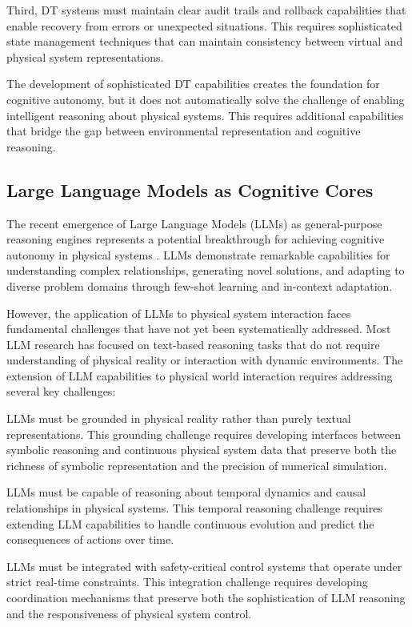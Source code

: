 Third, DT systems must maintain clear audit trails and rollback capabilities that enable recovery from errors or unexpected situations. This requires sophisticated state management techniques that can maintain consistency between virtual and physical system representations.

The development of sophisticated DT capabilities creates the foundation for cognitive autonomy, but it does not automatically solve the challenge of enabling intelligent reasoning about physical systems. This requires additional capabilities that bridge the gap between environmental representation and cognitive reasoning.

\subsection{Large Language Models as Cognitive Cores}

The recent emergence of Large Language Models (LLMs) as general-purpose reasoning engines represents a potential breakthrough for achieving cognitive autonomy in physical systems \cite{brown2020language, chowdhery2022palm}. LLMs demonstrate remarkable capabilities for understanding complex relationships, generating novel solutions, and adapting to diverse problem domains through few-shot learning and in-context adaptation.

However, the application of LLMs to physical system interaction faces fundamental challenges that have not yet been systematically addressed. Most LLM research has focused on text-based reasoning tasks that do not require understanding of physical reality or interaction with dynamic environments. The extension of LLM capabilities to physical world interaction requires addressing several key challenges:

LLMs must be grounded in physical reality rather than purely textual representations. This grounding challenge requires developing interfaces between symbolic reasoning and continuous physical system data that preserve both the richness of symbolic representation and the precision of numerical simulation.

LLMs must be capable of reasoning about temporal dynamics and causal relationships in physical systems. This temporal reasoning challenge requires extending LLM capabilities to handle continuous evolution and predict the consequences of actions over time.

LLMs must be integrated with safety-critical control systems that operate under strict real-time constraints. This integration challenge requires developing coordination mechanisms that preserve both the sophistication of LLM reasoning and the responsiveness of physical system control.


